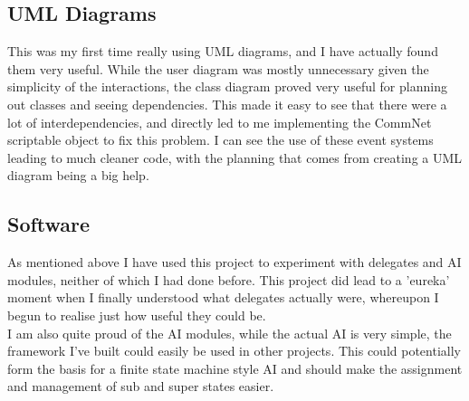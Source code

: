 \documentclass{article}
\begin{document}
        \subsection{UML Diagrams}
            This was my first time really using UML diagrams, and I have actually found them very useful. While the user diagram was mostly unnecessary given the simplicity of the interactions, the class diagram proved very useful for planning out classes and seeing dependencies. This made it easy to see that there were a lot of interdependencies, and directly led to me implementing the CommNet scriptable object to fix this problem. I can see the use of these event systems leading to much cleaner code, with the planning that comes from creating a UML diagram being a big help.

        \subsection{Software}
            As mentioned above I have used this project to experiment with delegates and AI modules, neither of which I had done before. This project did lead to a 'eureka' moment when I finally understood what delegates actually were, whereupon I begun to realise just how useful they could be. \\
            I am also quite proud of the AI modules, while the actual AI is very simple, the framework I've built could easily be used in other projects. This could potentially form the basis for a finite state machine style AI and should make the assignment and management of sub and super states easier.
\end{document}
